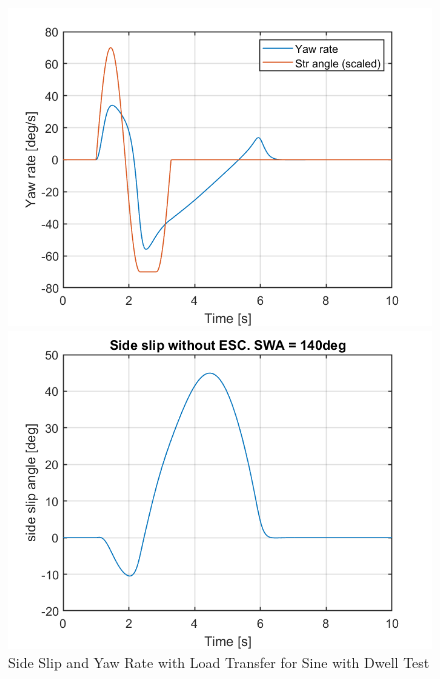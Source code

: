\begin{figure}[H]
      \begin{minipage}[b]{0.49\linewidth}
      \centering
        \includegraphics[width=\linewidth]{Figures/3_3_ESCoff.png}
    \end{minipage} 
    \begin{minipage}[b]{0.49\linewidth}
    \centering
        \includegraphics[width=\linewidth]{Figures/3_3_ESCoff_sideSlip.png}
    \end{minipage} 
    \caption{Side Slip and Yaw Rate with Load Transfer for Sine with Dwell Test}
\end{figure}

